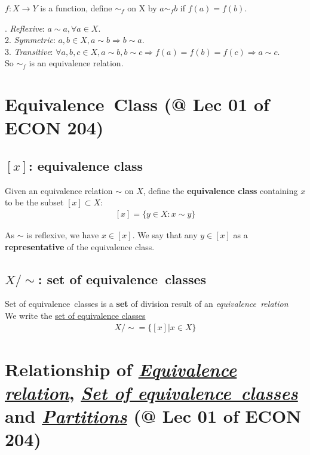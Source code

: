 \documentclass[11pt]{elegantbook}
\begin{document}
\begin{example}
    $f:X \rightarrow Y$ is a function, define $\sim_f$ on X by $a\sim_f b$ if $f(a)=f(b)$.
\end{example}
. \textit{Reflexive}: $a\sim a, \forall a\in X$.\\
2. \textit{Symmetric}: $a,b\in X ,a\sim b\Rightarrow b\sim a$.\\
3. \textit{Transitive}: $\forall a,b,c\in X ,a\sim b, b\sim c \Rightarrow f(a)=f(b)=f(c) \Rightarrow a\sim c$.\\
So $\sim_f$ is an equivalence relation.

\section{Equivalence Class \small{(@ Lec 01 of ECON 204)}}
\subsection{$[x]$: equivalence class}
\begin{definition}
\normalfont
Given an equivalence relation $\sim$ on $X$, define the \textbf{equivalence class} containing $x$ to be the subset $[x]\subset X$:
    \begin{equation}
        \begin{aligned}
            [x]=\{ y\in X: x\sim y\}
        \end{aligned}
        \nonumber
    \end{equation}
\end{definition}
As $\sim$ is reflexive, we have $x\in[x]$. We say that any $y\in[x]$ as a \textbf{representative} of the equivalence class.
\subsection{$X/\sim$: set of equivalence classes}
Set of equivalence classes is a \textbf{set} of division result of an \textit{equivalence relation}\\
We write the \underline{set of equivalence classes}
\begin{equation}
    \begin{aligned}
        X/\sim= \{[x]|x\in X \}
    \end{aligned}
    \nonumber
\end{equation}

\section{Relationship of \underline{\textit{Equivalence relation}}, \underline{\textit{Set of equivalence classes}} and \underline{\textit{Partitions}} \small{(@ Lec 01 of ECON 204)}}
\end{document}
